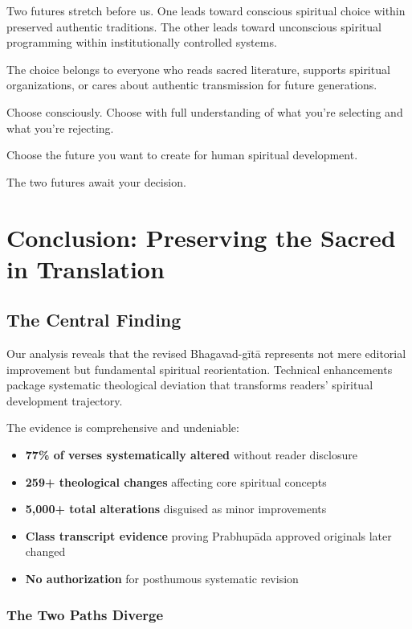 \documentclass[11pt,twoside]{book}
\begin{document}
Two futures stretch before us. One leads toward conscious spiritual choice within preserved authentic traditions. The other leads toward unconscious spiritual programming within institutionally controlled systems.

The choice belongs to everyone who reads sacred literature, supports spiritual organizations, or cares about authentic transmission for future generations.

Choose consciously. Choose with full understanding of what you're selecting and what you're rejecting.

Choose the future you want to create for human spiritual development.

The two futures await your decision.
\part*{Conclusion: Preserving the Sacred in Translation}
\label{sec:orgb7653ac}

\chapter*{The Central Finding}
\label{sec:orgbfe6489}

Our analysis reveals that the revised Bhagavad-gītā represents not mere editorial improvement but fundamental spiritual reorientation. Technical enhancements package systematic theological deviation that transforms readers' spiritual development trajectory.

The evidence is comprehensive and undeniable:
\begin{itemize}
\item \textbf{\textbf{77\% of verses systematically altered}} without reader disclosure
\item \textbf{\textbf{259+ theological changes}} affecting core spiritual concepts
\item \textbf{\textbf{5,000+ total alterations}} disguised as minor improvements
\item \textbf{\textbf{Class transcript evidence}} proving Prabhupāda approved originals later changed
\item \textbf{\textbf{No authorization}} for posthumous systematic revision
\end{itemize}
\section*{The Two Paths Diverge}
\label{sec:orgfe651bf}
\end{document}
